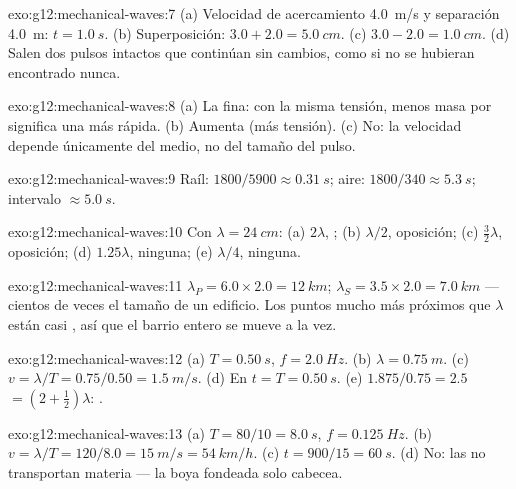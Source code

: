 \begin{solution}{exo:g12:mechanical-waves:7}
(a) Velocidad de acercamiento \qty{4.0}{m/s} y separación \qty{4.0}{m}:
$t = \qty{1.0}{s}$. (b) Superposición:
$3.0 + 2.0 = \qty{5.0}{cm}$. (c) $3.0 - 2.0 = \qty{1.0}{cm}$. (d) Salen
dos pulsos intactos que continúan sin cambios, como si no se hubieran
encontrado nunca.
\end{solution}

\begin{solution}{exo:g12:mechanical-waves:8}
(a) La fina: con la misma tensión, menos masa por  significa una
 más rápida. (b) Aumenta (más tensión). (c) No: la velocidad depende
únicamente del medio, no del tamaño del pulso.
\end{solution}

\begin{solution}{exo:g12:mechanical-waves:9}
Raíl: $1800/5900 \approx \qty{0.31}{s}$; aire:
$1800/340 \approx \qty{5.3}{s}$; intervalo $\approx \qty{5.0}{s}$.
\end{solution}

\begin{solution}{exo:g12:mechanical-waves:10}
Con $\lambda = \qty{24}{cm}$: (a) $2\lambda$, ; (b)
$\lambda/2$, oposición; (c) $\tfrac32\lambda$, oposición; (d)
$1.25\lambda$, ninguna; (e) $\lambda/4$, ninguna.
\end{solution}

\begin{solution}{exo:g12:mechanical-waves:11}
$\lambda_P = 6.0 \times 2.0 = \qty{12}{km}$;
$\lambda_S = 3.5 \times 2.0 = \qty{7.0}{km}$ --- cientos de veces el
tamaño de un edificio. Los puntos mucho más próximos que $\lambda$ están
casi , así que el barrio entero se mueve a la vez.
\end{solution}

\begin{solution}{exo:g12:mechanical-waves:12}
(a) $T = \qty{0.50}{s}$, $f = \qty{2.0}{Hz}$.
(b) $\lambda = \qty{0.75}{m}$.
(c) $v = \lambda/T = 0.75/0.50 = \qty{1.5}{m/s}$.
(d) En $t = T = \qty{0.50}{s}$. (e) $1.875/0.75 = 2.5$  $= (2 + \tfrac12)\lambda$: .
\end{solution}

\begin{solution}{exo:g12:mechanical-waves:13}
(a) $T = 80/10 = \qty{8.0}{s}$, $f = \qty{0.125}{Hz}$.
(b) $v = \lambda/T = 120/8.0 = \qty{15}{m/s} = \qty{54}{km/h}$.
(c) $t = 900/15 = \qty{60}{s}$. (d) No: las  no transportan materia
--- la boya fondeada solo cabecea.
\end{solution}


